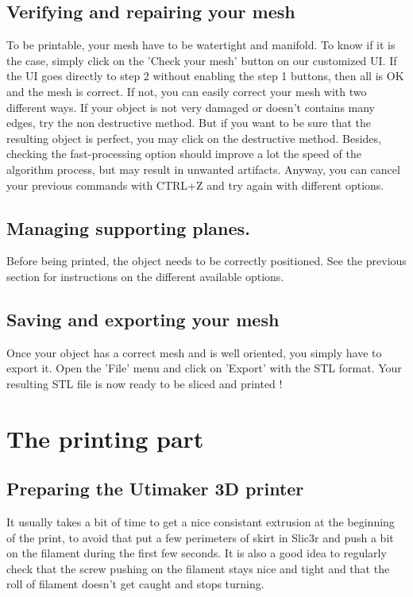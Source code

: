 \documentclass{article}
\begin{document}
\subsection{Verifying and repairing your mesh}

To be printable, your mesh have to be watertight and manifold. To know if it is the case, simply click on the 'Check your mesh' button on our customized UI. If the UI goes directly to step 2 without enabling the step 1 buttons, then all is OK and the mesh is correct. If not, you can easily correct your mesh with two different ways. If your object is not very damaged or doesn't contains many edges, try the non destructive method. But if you want to be sure that the resulting object is perfect, you may click on the destructive method. Besides, checking the fast-processing option should improve a lot the speed of the algorithm process, but may result in unwanted artifacts. Anyway, you can cancel your previous commands with CTRL+Z and try again with different options.

\subsection{Managing supporting planes.}
Before being printed, the object needs to be correctly positioned. See the previous section for instructions on the different available options.

\subsection{Saving and exporting your mesh}

Once your object has a correct mesh and is well oriented, you simply have to export it. Open the 'File' menu and click on 'Export' with the STL format. Your resulting STL file is now ready to be sliced and printed !

\newpage

\section{The printing part}

\subsection{Preparing the Utimaker 3D printer}

It usually takes a bit of time to get a nice consistant extrusion at the beginning of the print, to avoid that put a few perimeters of skirt in Slic3r and push a bit on the filament during the first few seconds.
It is also a good idea to regularly check that the screw pushing on the filament stays nice and tight and that the roll of filament doesn't get caught and stops turning.
\end{document}
